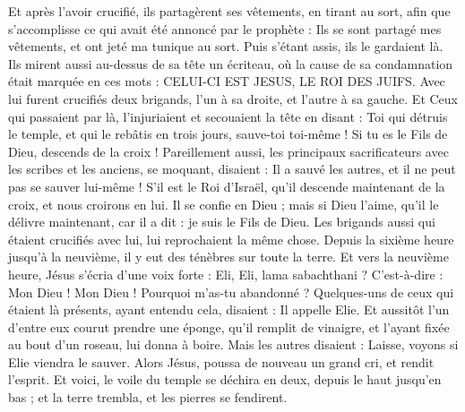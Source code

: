 \begin{multicols}{2}
Et après l'avoir crucifié, ils partagèrent ses vêtements, en tirant au sort, afin que s’accomplisse ce qui avait été annoncé par le prophète : Ils se sont partagé mes vêtements, et ont jeté ma tunique au sort.
Puis s’étant assis, ils le gardaient là.
Ils mirent aussi au-dessus de sa tête un écriteau, où la cause de sa condamnation était marquée en ces mots : CELUI-CI EST JESUS, LE ROI DES JUIFS.
Avec lui furent crucifiés deux brigands, l'un à sa droite, et l'autre à sa gauche.
Et Ceux qui passaient par là, l’injuriaient et secouaient la tête
en disant : Toi qui détruis le temple, et qui le rebâtis en trois jours, sauve-toi toi-même ! Si tu es le Fils de Dieu, descends de la croix !
Pareillement aussi, les principaux sacrificateurs avec les scribes et les anciens, se moquant, disaient :
Il a sauvé les autres, et il ne peut pas se sauver lui-même ! S’il est le Roi d'Israël, qu'il descende maintenant de la croix, et nous croirons en lui.
Il se confie en Dieu ; mais si Dieu l’aime, qu’il le délivre maintenant, car il a dit : je suis le Fils de Dieu.
Les brigands aussi qui étaient crucifiés avec lui, lui reprochaient la même chose.
Depuis la sixième heure jusqu’à la neuvième, il y eut des ténèbres sur toute la terre.
Et vers la neuvième heure, Jésus s'écria d’une voix forte : Eli, Eli, lama sabachthani ? C’est-à-dire : Mon Dieu ! Mon Dieu ! Pourquoi m'as-tu abandonné ?
Quelques-uns de ceux qui étaient là présents, ayant entendu cela, disaient : Il appelle Elie.
Et aussitôt l’un d'entre eux courut prendre une éponge, qu’il remplit de vinaigre, et l’ayant fixée au bout d'un roseau, lui donna à boire.
Mais les autres disaient : Laisse, voyons si Elie viendra le sauver.
Alors Jésus, poussa de nouveau un grand cri, et rendit l'esprit.
Et voici, le voile du temple se déchira en deux, depuis le haut jusqu'en bas ; et la terre trembla, et les pierres se fendirent.

\end{multicols}
